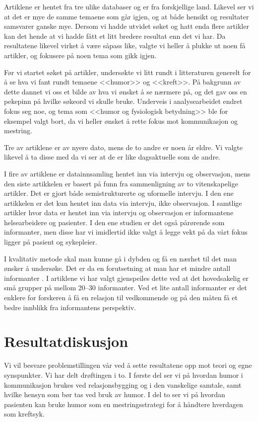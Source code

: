 Artiklene er hentet fra tre ulike databaser og er fra forskjellige land.
Likevel ser vi at det er mye de samme temaene som går igjen, og at både hensikt
og resultater samsvarer ganske mye. Dersom vi hadde utvidet søket og hatt enda
flere artikler kan det hende at vi hadde fått et litt bredere resultat enn det
vi har. Da resultatene likevel virket å være såpass like, valgte vi heller å
plukke ut noen få artikler, og fokusere på noen tema som gikk igjen.

Før vi startet søket på artikler, undersøkte vi litt rundt i litteraturen
generelt for å se hva vi fant rundt temaene <<humor>> og <<kreft>>. På bakgrunn
av dette dannet vi oss et bilde av hva vi ønsket å se nærmere på, og det gav
oss en pekepinn på hvilke søkeord vi skulle bruke. Underveis i analysearbeidet
endret fokus seg noe, og tema som <<humor og fysiologisk betydning>> ble for
eksempel valgt bort, da vi heller ønsket å rette fokus mot kommunikasjon og
mestring.

Tre av artiklene er av nyere dato, mens de to andre er noen år eldre. Vi valgte
likevel å ta disse med da vi ser at de er like dagsaktuelle som de andre.

I fire av artiklene er datainnsamling hentet inn via intervju og observasjon,
mens den siste artikkelen er basert på funn fra sammenligning av to
vitenskapelige artikler. Det er gjort både semistrukturerte og uformelle
intervju. I den ene artikkelen er det kun hentet inn data via intervju, ikke
observasjon. I samtlige artikler hvor data er hentet inn via intervju og
observasjon er informantene helsearbeidere og pasienter. I den ene studien er
det også pårørende som informanter, men disse har vi imidlertid ikke valgt å
legge vekt på da vårt fokus ligger på pasient og sykepleier.

I kvalitativ metode skal man kunne gå i dybden og få en nærhet til det man
ønsker å undersøke. Det er da en forutsetning at man har et mindre antall
informanter \cite{olsson2003}. I artiklene vi har valgt gjenspeiles dette ved
at  det hovedsakelig er små grupper på mellom 20--30 informanter.  Ved et lite
antall informanter er det enklere for forskeren å få en relasjon til
vedkommende og på den måten få et bedre innblikk fra informantens perspektiv.

\section{Resultatdiskusjon}

Vi vil besvare problemstillingen vår ved å sette resultatene opp mot teori og
egne synspunkter. Vi har delt drøftingen i to. I første del ser vi på hvordan
humor i kommunikasjon brukes ved relasjonsbygging og i den vanskelige samtale,
samt hvilke hensyn som bør tas ved bruk av humor. I del to ser vi på hvordan
pasienten kan bruke humor som en mestringsstrategi for å håndtere hverdagen som
kreftsyk.

